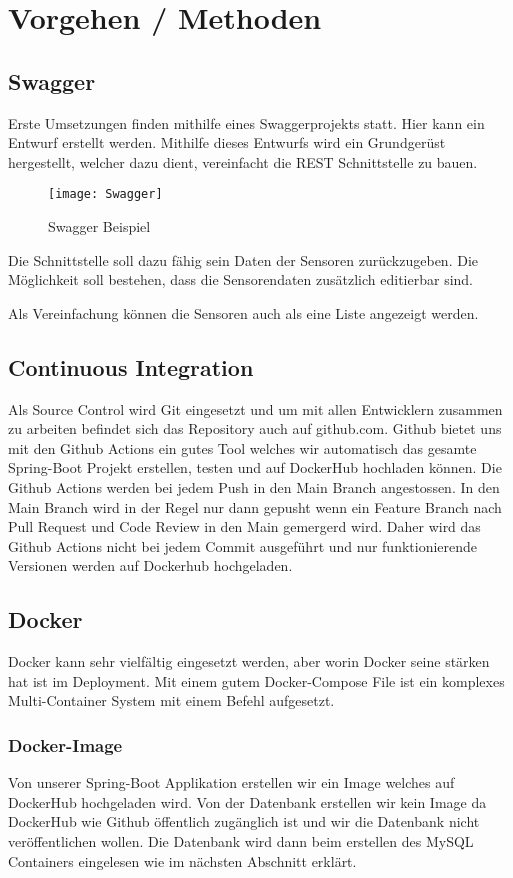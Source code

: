 \documentclass[../main.tex]{subfiles}
\begin{document}
	\section{Vorgehen / Methoden}
	
	\subsection{Swagger}
	Erste Umsetzungen finden mithilfe eines Swaggerprojekts statt. Hier kann ein Entwurf erstellt werden. Mithilfe dieses Entwurfs wird ein Grundgerüst hergestellt, welcher dazu dient, vereinfacht die REST Schnittstelle zu bauen.
	
	\begin{figure}[h]
		\centering
		\texttt{[image: Swagger]}
		\caption{Swagger Beispiel}
		\label{fig:Swagger}
	\end{figure}
	
	Die Schnittstelle soll dazu fähig sein Daten der Sensoren zurückzugeben. Die Möglichkeit soll bestehen, dass die Sensorendaten zusätzlich editierbar sind.
	
	Als Vereinfachung können die Sensoren auch als eine Liste angezeigt werden.
	
	\subsection{Continuous Integration}
	Als Source Control wird Git eingesetzt und um mit allen Entwicklern zusammen zu arbeiten befindet sich das Repository auch auf github.com. Github bietet uns mit den Github Actions ein gutes Tool welches wir automatisch das gesamte Spring-Boot Projekt erstellen, testen und auf DockerHub hochladen können. Die Github Actions werden bei jedem Push in den Main Branch angestossen. In den Main Branch wird in der Regel nur dann gepusht wenn ein Feature Branch nach Pull Request und Code Review in den Main gemergerd wird. Daher wird das Github Actions nicht bei jedem Commit ausgeführt und nur funktionierende Versionen werden auf Dockerhub hochgeladen.
	
	\subsection{Docker}
	Docker kann sehr vielfältig eingesetzt werden, aber worin Docker seine stärken hat ist im Deployment. Mit einem gutem Docker-Compose File ist ein komplexes Multi-Container System mit einem Befehl aufgesetzt.
	
	\subsubsection{Docker-Image}
	Von unserer Spring-Boot Applikation erstellen wir ein Image welches auf DockerHub hochgeladen wird. Von der Datenbank erstellen wir kein Image da DockerHub wie Github öffentlich zugänglich ist und wir die Datenbank nicht veröffentlichen wollen. Die Datenbank wird dann beim erstellen des MySQL Containers eingelesen wie im nächsten Abschnitt erklärt.
	
\end{document}
